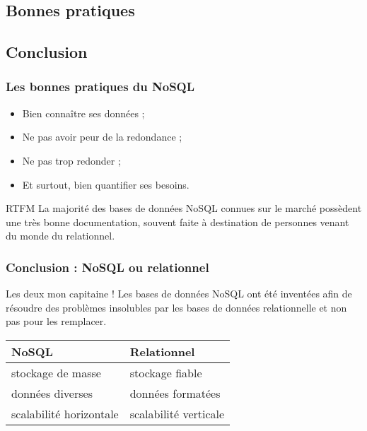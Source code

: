 	\subsection{Bonnes pratiques}
	\subsection{Conclusion}
	
	\begin{frame}
		\frametitle{Les bonnes pratiques du NoSQL}

		\begin{itemize}
			\item Bien connaître ses données ;
			\item Ne pas avoir peur de la redondance ;
			\item Ne pas trop redonder ;
			\item Et surtout, bien quantifier ses besoins.
		\end{itemize}


		\begin{block}{RTFM}
			La majorité des bases de données NoSQL connues sur le marché possèdent une très bonne documentation, souvent faite à destination de personnes venant du monde du relationnel.
		\end{block}
	\end{frame}
	
	\begin{frame}
		\frametitle{Conclusion : NoSQL ou relationnel}

		\begin{alertblock}{Les deux mon capitaine !}
			Les bases de données NoSQL ont été inventées afin de résoudre des problèmes insolubles par les bases de données relationnelle et non pas pour les remplacer.
		\end{alertblock}

		\vspace{20px}
		
		\begin{tabular}{|l|l|}
			\hline
			\textbf{NoSQL} & \textbf{Relationnel} \\ \hline\hline
			stockage de masse & stockage fiable \\ \hline
			données diverses & données formatées \\ \hline
			scalabilité horizontale & scalabilité verticale \\ \hline
		\end{tabular}

	\end{frame}

